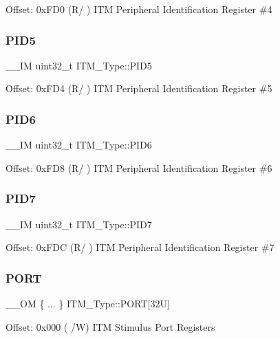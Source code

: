 Offset\+: 0x\+F\+D0 (R/ ) I\+TM Peripheral Identification Register \#4 \mbox{\label{structITM__Type_af9085648bf18f69b5f9d1136d45e1d37}} 
\subsubsection{\texorpdfstring{PID5}{PID5}}
{\footnotesize\ttfamily \+\_\+\+\_\+\+IM uint32\+\_\+t I\+T\+M\+\_\+\+Type\+::\+P\+I\+D5}

Offset\+: 0x\+F\+D4 (R/ ) I\+TM Peripheral Identification Register \#5 \mbox{\label{structITM__Type_ad34dbe6b1072c77d36281049c8b169f6}} 
\subsubsection{\texorpdfstring{PID6}{PID6}}
{\footnotesize\ttfamily \+\_\+\+\_\+\+IM uint32\+\_\+t I\+T\+M\+\_\+\+Type\+::\+P\+I\+D6}

Offset\+: 0x\+F\+D8 (R/ ) I\+TM Peripheral Identification Register \#6 \mbox{\label{structITM__Type_a2bcec6803f28f30d5baf5e20e3517d3d}} 
\subsubsection{\texorpdfstring{PID7}{PID7}}
{\footnotesize\ttfamily \+\_\+\+\_\+\+IM uint32\+\_\+t I\+T\+M\+\_\+\+Type\+::\+P\+I\+D7}

Offset\+: 0x\+F\+DC (R/ ) I\+TM Peripheral Identification Register \#7 \mbox{\label{structITM__Type_a86982b964e7e65e6ac1574016d8cd857}} 
\subsubsection{\texorpdfstring{PORT}{PORT}}
{\footnotesize\ttfamily \+\_\+\+\_\+\+OM \{ ... \}    I\+T\+M\+\_\+\+Type\+::\+P\+O\+RT\mbox{[}32\+U\mbox{]}}

Offset\+: 0x000 ( /W) I\+TM Stimulus Port Registers \mbox{\label{structITM__Type_a04b9fbc83759cb818dfa161d39628426}} 

